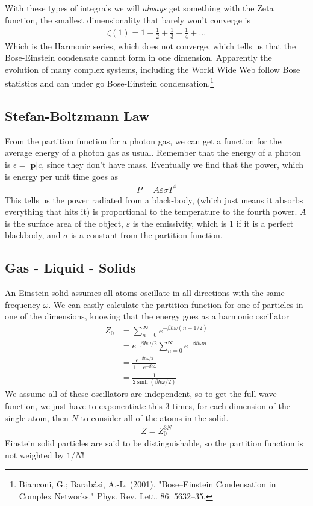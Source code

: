 With these types of integrals we will \emph{always} get something with the Zeta function, the smallest dimensionality that barely won't converge is 
\begin{align}
    \zeta(1) = 1 + \frac{1}{2} + \frac{1}{3} + \frac{1}{4} + ...
\end{align}
Which is the Harmonic series, which does not converge, which tells us that the Bose-Einstein condensate cannot form in one dimension. Apparently the evolution of many complex systems, including the World Wide Web follow Bose statistics and can under go Bose-Einstein condensation.\footnote{Bianconi, G.; Barabási, A.-L. (2001). "Bose–Einstein Condensation in Complex Networks." Phys. Rev. Lett. 86: 5632–35.} 

\subsection{Stefan-Boltzmann Law}
From the partition function for a photon gas, we can get a function for the average energy of a photon gas as usual. Remember that the energy of a photon is $\epsilon = |\textbf{p}|c$, since they don't have mass. Eventually we find that the power, which is energy per unit time goes as 
\begin{align}
    P = A\varepsilon \sigma T^4
\end{align}
This tells us the power radiated from a black-body, (which just means it absorbs everything that hits it) is proportional to the temperature to the fourth power. $A$ is the surface area of the object, $\varepsilon$ is the emissivity, which is 1 if it is a perfect blackbody, and $\sigma$ is a constant from the partition function.

\subsection{Gas - Liquid - Solids}
An Einstein solid assumes all atoms oscillate in all directions with the same frequency $\omega$. We can easily calculate the partition function for one of particles in one of the dimensions, knowing that the energy goes as a harmonic oscillator
\begin{align}
    Z_0 &= \sum_{n=0}^\infty e^{-\beta\hbar\omega(n+1/2)}\\
    &= e^{-\beta\hbar\omega/2} \sum_{n=0}^\infty e^{-\beta\hbar\omega n}\\
    &= \frac{e^{-\beta\hbar\omega/2}}{1-e^{-\beta\hbar\omega}}\\
    &= \frac{1}{2\sinh(\beta\hbar\omega/2)}
\end{align}
We assume all of these oscillators are independent, so to get the full wave function, we just have to exponentiate this 3 times, for each dimension of the single atom, then $N$ to consider all of the atoms in the solid.
\begin{align}
    Z = Z_0^{3N}
\end{align}
Einstein solid particles are said to be distinguishable, so the partition function is not weighted by $1/N!$

